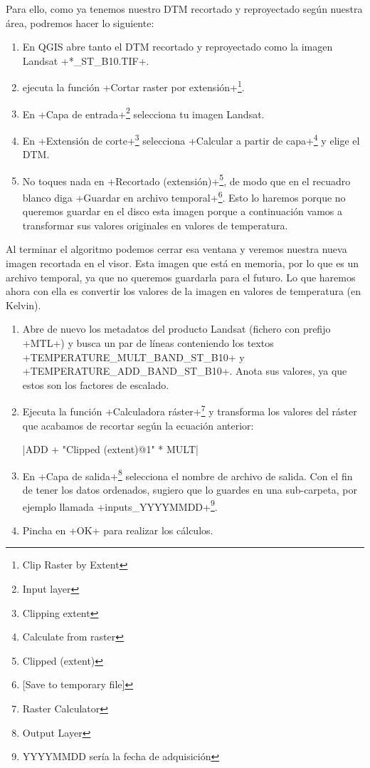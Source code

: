 \documentclass[a4paper,11pt]{article}
\begin{document}
    Para ello, como ya tenemos nuestro DTM recortado y reproyectado según nuestra área, podremos hacer lo siguiente:
    \begin{enumerate}
     \item En QGIS abre tanto el DTM recortado y reproyectado como la imagen Landsat \cverb+*_ST_B10.TIF+.
     
     \item ejecuta la función \cverb+Cortar raster por extensión+\footnote{Clip Raster by Extent}.
     
     \item En \cverb+Capa de entrada+\footnote{Input layer} selecciona tu imagen Landsat.
     
     \item En \cverb+Extensión de corte+\footnote{Clipping extent} selecciona \cverb+Calcular a partir de capa+\footnote{Calculate from raster} y elige el DTM.
     
     \item No toques nada en \cverb+Recortado (extensión)+\footnote{Clipped (extent)}, de modo que en el recuadro blanco diga \cverb+Guardar en archivo temporal+\footnote{{[Save to temporary file]}}. Esto lo haremos porque no queremos guardar en el disco esta imagen porque a continuación vamos a transformar sus valores originales en valores de temperatura.
    \end{enumerate}
    
    Al terminar el algoritmo podemos cerrar esa ventana y veremos nuestra nueva imagen recortada en el visor. Esta imagen que está en memoria, por lo que es un archivo temporal, ya que no queremos guardarla para el futuro. Lo que haremos ahora con ella es convertir los valores de la imagen en valores de temperatura (en Kelvin). 
    
    \begin{enumerate}
      \item Abre de nuevo los metadatos del producto Landsat (fichero con prefijo \cverb+MTL+) y busca un par de líneas conteniendo los textos\\ \cverb+TEMPERATURE_MULT_BAND_ST_B10+ y \cverb+TEMPERATURE_ADD_BAND_ST_B10+. Anota sus valores, ya que estos son los factores de escalado.
      
      \item Ejecuta la función \cverb+Calculadora ráster+\footnote{Raster Calculator} y transforma los valores del ráster que acabamos de recortar según la ecuación anterior:
      
      \cverb|ADD + "Clipped (extent)@1" * MULT|\\
     
      \item En \cverb+Capa de salida+\footnote{Output Layer} selecciona el nombre de archivo de salida. Con el fin de tener los datos ordenados, sugiero que lo guardes en una sub-carpeta, por ejemplo llamada \cverb+inputs_YYYYMMDD+\footnote{YYYYMMDD sería la fecha de adquisición}.
      
      \item Pincha en \cverb+OK+ para realizar los cálculos.
    \end{enumerate}
    
\end{document}
